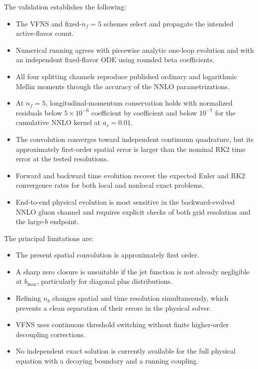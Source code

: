 \documentclass[11pt]{article}
\newcommand{\as}{a_s}
\begin{document}
The validation establishes the following:
\begin{itemize}[leftmargin=1.5em]
  \item The VFNS and fixed-\(n_f=5\) schemes select and propagate the intended
  active-flavor count.
  \item Numerical running agrees with piecewise analytic one-loop evolution
  and with an independent fixed-flavor ODE using rounded beta coefficients.
  \item All four splitting channels reproduce published ordinary and
  logarithmic Mellin moments through the accuracy of the NNLO
  parametrizations.
  \item At \(n_f=5\), longitudinal-momentum conservation holds with normalized
  residuals below \(5\times10^{-6}\) coefficient by coefficient and below
  \(10^{-7}\) for the cumulative NNLO kernel at \(\as=0.01\).
  \item The convolution converges toward independent continuum quadrature,
  but its approximately first-order spatial error is larger than the
  nominal RK2 time error at the tested resolutions.
  \item Forward and backward time evolution recover the expected Euler and
  RK2 convergence rates for both local and nonlocal exact problems.
  \item End-to-end physical evolution is most sensitive in the
  backward-evolved NNLO gluon channel and requires explicit checks of both
  grid resolution and the large-\(b\) endpoint.
\end{itemize}

The principal limitations are:
\begin{itemize}[leftmargin=1.5em]
  \item The present spatial convolution is approximately first order.
  \item A sharp zero closure is unsuitable if the jet function is not already
  negligible at \(b_{\max}\), particularly for diagonal plus distributions.
  \item Refining \(n_b\) changes spatial and time resolution simultaneously,
  which prevents a clean separation of their errors in the physical solver.
  \item VFNS uses continuous threshold switching without finite higher-order
  decoupling corrections.
  \item No independent exact solution is currently available for the full
  physical equation with a decaying boundary and a running coupling.
\end{itemize}
\end{document}
